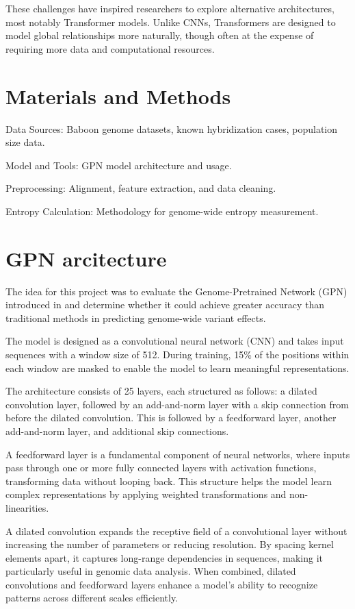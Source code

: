\documentclass[
  a4paper,
]{scrbook}
\begin{document}
These challenges have inspired researchers to explore alternative
architectures, most notably Transformer models. Unlike CNNs,
Transformers are designed to model global relationships more naturally,
though often at the expense of requiring more data and computational
resources.

\chapter{Materials and Methods}\label{materials-and-methods}

Data Sources: Baboon genome datasets, known hybridization cases,
population size data.

Model and Tools: GPN model architecture and usage.

Preprocessing: Alignment, feature extraction, and data cleaning.

Entropy Calculation: Methodology for genome-wide entropy measurement.

\chapter{GPN arcitecture}\label{gpn-arcitecture}

The idea for this project was to evaluate the Genome-Pretrained Network
(GPN) introduced in \cite{Kantorovitz2024} and determine whether it
could achieve greater accuracy than traditional methods in predicting
genome-wide variant effects.

The model is designed as a convolutional neural network (CNN) and takes
input sequences with a window size of 512. During training, 15\% of the
positions within each window are masked to enable the model to learn
meaningful representations.

The architecture consists of 25 layers, each structured as follows: a
dilated convolution layer, followed by an add-and-norm layer with a skip
connection from before the dilated convolution. This is followed by a
feedforward layer, another add-and-norm layer, and additional skip
connections.

A feedforward layer is a fundamental component of neural networks, where
inputs pass through one or more fully connected layers with activation
functions, transforming data without looping back. This structure helps
the model learn complex representations by applying weighted
transformations and non-linearities.

A dilated convolution expands the receptive field of a convolutional
layer without increasing the number of parameters or reducing
resolution. By spacing kernel elements apart, it captures long-range
dependencies in sequences, making it particularly useful in genomic data
analysis. When combined, dilated convolutions and feedforward layers
enhance a model's ability to recognize patterns across different scales
efficiently.
\end{document}
